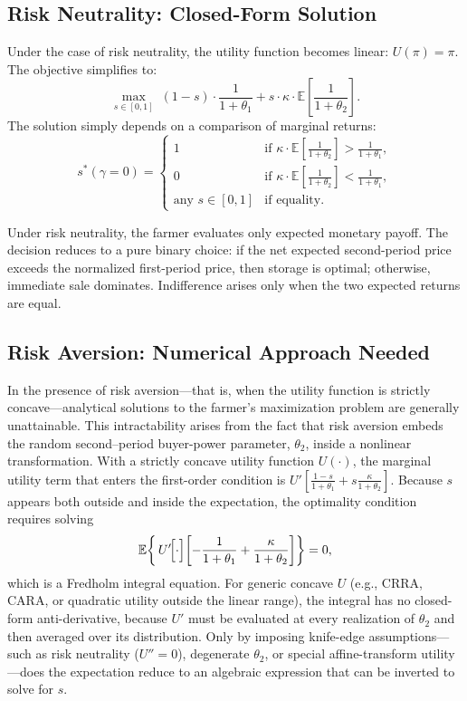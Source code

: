 \subsection{Risk Neutrality: Closed-Form Solution}
\noindent Under the case of risk neutrality, the utility function becomes linear: $U(\pi) = \pi$. The objective simplifies to:
\begin{equation}
\max_{s \in [0,1]} \; 
(1 - s) \cdot \frac{1}{1 + \theta_1} 
+ 
s \cdot \kappa \cdot \mathbb{E} \left[ \frac{1}{1 + \theta_2} \right].
\end{equation}
The solution simply depends on a comparison of marginal returns:
\begin{equation}
s^*( \gamma = 0) =
\begin{cases}
1 & \text{if } \kappa \cdot \mathbb{E} \left[ \frac{1}{1 + \theta_2} \right] > \frac{1}{1 + \theta_1}, \\
0 & \text{if } \kappa \cdot \mathbb{E} \left[ \frac{1}{1 + \theta_2} \right] < \frac{1}{1 + \theta_1}, \\
\text{any } s \in [0,1] & \text{if equality}.
\end{cases}
\label{Eq: risk-neutrality solution}
\end{equation}

\noindent Under risk neutrality, the farmer evaluates only expected monetary payoff. The decision reduces to a pure binary choice: if the net expected second-period price exceeds the normalized first-period price, then storage is optimal; otherwise, immediate sale dominates. Indifference arises only when the two expected returns are equal.


\subsection{Risk Aversion: Numerical Approach Needed}
\noindent In the presence of risk aversion---that is, when the utility function is strictly concave---analytical solutions to the farmer's maximization problem are generally unattainable. This intractability arises from the fact that risk aversion embeds the random second--period buyer-power parameter, $\theta_2$, inside a nonlinear transformation.  With a strictly concave utility function $U(\cdot)$, the marginal utility term that enters the first-order condition is $U'\!\left[\frac{1-s}{1+\theta_1}+ s\frac{\kappa}{1+\theta_2}\right]$.  Because $s$ appears both outside and inside the expectation, the optimality condition requires solving
$$
\mathbb{E}\!\left\{\,U'\!\Bigl[\cdot\Bigr]\!\left[-\frac{1}{1+\theta_1}+\frac{\kappa}{1+\theta_2}\right]\right\}=0,
$$
which is a Fredholm integral equation. For generic concave $U$ (e.g., CRRA, CARA, or quadratic utility outside the linear range), the integral has no closed-form anti-derivative, because $U'$ must be evaluated at every realization of $\theta_2$ and then averaged over its distribution. Only by imposing knife-edge assumptions---such as risk neutrality ($U''=0$), degenerate $\theta_2$, or special affine-transform utility---does the expectation reduce to an algebraic expression that can be inverted to solve for $s$.

